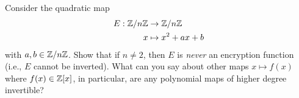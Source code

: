 
\begin{problem}
Consider the quadratic map
\begin{align*}
E:\mathbb{Z}/n\mathbb{Z} &\to \mathbb{Z}/n\mathbb{Z} \\
x &\mapsto x^2+ax+b
\end{align*}
with $a,b \in \mathbb{Z}/n\mathbb{Z}$.  Show that if $n \neq 2$, then $E$ is
\emph{never} an encryption function (i.e., $E$ cannot be inverted).
What can you say about other maps $x \mapsto f(x)$ where $f(x) \in
\mathbb{Z}[x]$, in particular, are any polynomial maps of higher degree invertible?
\end{problem}
\begin{Answer}

\end{Answer}
